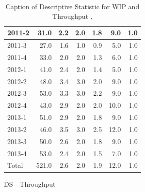 \documentclass[UKenglish]{ifimaster}  %
\begin{document}
\begin{appendices}
\begin{table}[!htbp]
\begin{adjustwidth}{-1.5cm}{}
\begin{subfigure}[b]{0.3\textwidth}
{\begin{tabular}{ | l | r | r | r | r | r | r | }
2011-2 & 31.0 & 2.2 & 2.0 & 1.8 & 9.0 & 1.0\\ \hline
2011-3 & 27.0 & 1.6 & 1.0 & 0.9 & 5.0 & 1.0\\ \hline
2011-4 & 33.0 & 2.0 & 2.0 & 1.3 & 6.0 & 1.0\\ \hline
2012-1 & 41.0 & 2.4 & 2.0 & 1.4 & 5.0 & 1.0\\ \hline
2012-2 & 48.0 & 3.4 & 3.0 & 2.0 & 9.0 & 1.0\\ \hline
2012-3 & 53.0 & 3.3 & 3.0 & 2.2 & 9.0 & 1.0\\ \hline
2012-4 & 43.0 & 2.9 & 2.0 & 2.0 & 10.0 & 1.0\\ \hline
2013-1 & 51.0 & 2.9 & 2.0 & 1.8 & 9.0 & 1.0\\ \hline
2013-2 & 46.0 & 3.5 & 3.0 & 2.5 & 12.0 & 1.0\\ \hline
2013-3 & 50.0 & 2.6 & 2.0 & 1.8 & 9.0 & 1.0\\ \hline
2013-4 & 53.0 & 2.4 & 2.0 & 1.5 & 7.0 & 1.0\\ \hline
Total & 521.0 & 2.6 & 2.0 & 1.9 & 12.0 & 1.0\\ \hline
\end{tabular}
}
\caption{DS - Throughput}
 \label{DS:Throughput:9}
\end{subfigure}
\end{adjustwidth}
\caption[Optional caption for list of figures]{Caption of Descriptive Statistic for WIP and Throughput  , }
\label{DS:9:1}
\end{table}


\end{appendices}
\end{document}
